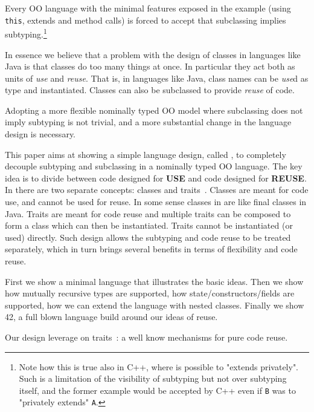 Every OO language with the minimal features exposed in the example (using \lstinline{this},
extends and method calls) is forced to accept that subclassing implies
subtyping.\footnote{ Note how this is true also in C++, where is
  possible to "extends privately". Such is a limitation of the
  visibility of subtyping but not over subtyping itself, and the
  former example would be accepted by C++ even if \lstinline{B} was to
  "privately extends" \lstinline{A}.}
  
In essence we believe that a problem with the design of classes in languages like Java
is that classes do too many things at once. In particular they act
both as units of \emph{use} and \emph{reuse}.
That is, in languages like Java, class names can be
\emph{use}d as type and instantiated.
Classes can also be subclassed to provide \emph{reuse}
of code.  

Adopting a more flexible nominally typed OO model where subclassing does not imply subtyping is not trivial,
and a more substantial change in the language design is necessary.


This paper aims at showing a simple language design, called \name, to
completely decouple subtyping and subclassing in a nominally typed OO
language. The key idea is to divide between code designed for
\textbf{USE} and code designed for \textbf{REUSE}. 
In \name there are two separate concepts: classes
and traits~\cite{}. Classes are meant for code use, and cannot be used
for reuse. In some sense classes in \name are like final classes in
Java. Traits are meant for code reuse and multiple traits can be
composed to form a class which can then be instantiated. Traits 
cannot be instantiated (or used) directly. Such design allows the
subtyping and code reuse to be treated separately, which in turn
brings several benefits in terms of flexibility and code reuse.

First we show a minimal language that illustrates the basic ideas. 
Then we show how mutually recursive types
are supported, how state/constructors/fields are supported,
how we can extend the language with nested classes.
Finally we show 42, a full blown language build around our ideas of
reuse.

Our design leverage on traits~\cite{ducasse2006traits}: a well know mechanisms for pure
code reuse.


